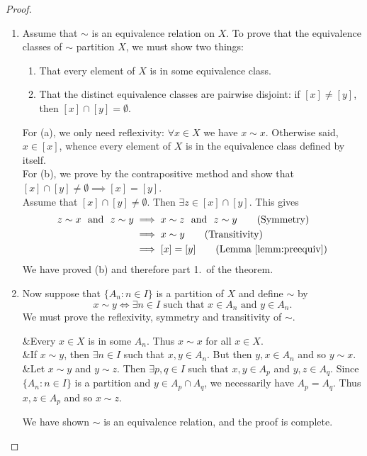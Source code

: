 \begin{proof}
\begin{enumerate}
\item Assume that $\sim$ is an equivalence relation on $X$. To prove that the equivalence classes of $\sim$ partition $X$, we must show two things:
\begin{enumerate}
  \item That every element of $X$ is in some equivalence class.
  \item That the distinct equivalence classes are pairwise disjoint: if $[x]\neq[y]$, then $[x]\cap[y]=\emptyset$.
\end{enumerate}
For (a), we only need reflexivity: $\forall x\in X$ we have $x\sim x$. Otherwise said, $x\in[x]$, whence every element of $X$ is in the equivalence class defined by itself.\\[5pt]
For (b), we prove by the contrapositive method and show that $[x]\cap [y]\neq\emptyset\implies [x]=[y]$.\\
Assume that $[x]\cap [y]\neq\emptyset$. Then $\exists z\in [x]\cap [y]$. This gives
\begin{align*}
z\sim x\ \text{ and }\ z\sim y&\implies x\sim z\ \text{ and }\ z\sim y\tag*{(Symmetry)}\\*
&\implies x\sim y\tag*{(Transitivity)}\\*
&\implies [x]=[y]\tag*{(Lemma \ref{lemm:preequiv})}
\end{align*}
We have proved (b) and therefore part 1.\ of the theorem.
\item Now suppose that $\{A_n:n\in I\}$ is a partition of $X$ and define $\sim$ by
\[x\sim y\iff \exists n\in I\text{ such that $x\in A_n$ and $y\in A_n$.}\]
We must prove the reflexivity, symmetry and transitivity of $\sim$.
\begin{eptabular}{\trans}
	&Every $x\in X$ is in some $A_n$. Thus $x\sim x$ for all $x\in X$.\\
	\symm&If $x\sim y$, then $\exists n\in I$ such that $x,y\in A_n$. But then $y,x\in A_n$ and so $y\sim x$.\\
	\trans&Let $x\sim y$ and $y\sim z$. Then $\exists p,q\in I$ such that $x,y\in A_p$ and $y,z\in A_q$. Since $\{A_n:n\in I\}$ is a partition and $y\in A_p\cap A_q$, we necessarily have $A_p=A_q$. Thus $x,z\in A_p$ and so $x\sim z$.
\end{eptabular}

We have shown $\sim$ is an equivalence relation, and the proof is complete.\qedhere
\end{enumerate}
\end{proof}
	
